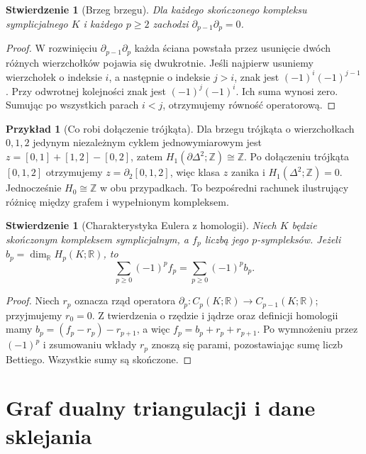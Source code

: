 \documentclass[11pt,a4paper]{report}
\numberwithin{equation}{section}
\theoremstyle{plain}
\newtheorem{stwierdzenie}[twierdzenie]{Stwierdzenie}
\theoremstyle{definition}
\newtheorem{przyklad}[twierdzenie]{Przykład}
\theoremstyle{remark}
\begin{document}
\begin{stwierdzenie}[Brzeg brzegu]
Dla każdego skończonego kompleksu symplicjalnego $K$
i każdego $p\ge2$ zachodzi $\partial_{p-1}\partial_p=0$.
\end{stwierdzenie}

\begin{proof}
W rozwinięciu $\partial_{p-1}\partial_p$ każda ściana
powstała przez usunięcie dwóch różnych wierzchołków
pojawia się dwukrotnie. Jeśli najpierw usuniemy wierzchołek
o indeksie $i$, a następnie o indeksie $j>i$, znak jest
$(-1)^i(-1)^{j-1}$. Przy odwrotnej kolejności znak jest
$(-1)^j(-1)^i$. Ich suma wynosi zero. Sumując po wszystkich
parach $i<j$, otrzymujemy równość operatorową.
\end{proof}

\begin{przyklad}[Co robi dołączenie trójkąta]
Dla brzegu trójkąta o wierzchołkach $0,1,2$ jedynym
niezależnym cyklem jednowymiarowym jest
$z=[0,1]+[1,2]-[0,2]$, zatem
$H_1(\partial\Delta^2;\mathbb Z)\cong\mathbb Z$.
Po dołączeniu trójkąta $[0,1,2]$ otrzymujemy
$z=\partial_2[0,1,2]$, więc klasa $z$ zanika i
$H_1(\Delta^2;\mathbb Z)=0$. Jednocześnie $H_0\cong\mathbb Z$
w obu przypadkach. To bezpośredni rachunek ilustrujący
różnicę między grafem i wypełnionym kompleksem.
\end{przyklad}

\begin{stwierdzenie}[Charakterystyka Eulera z homologii]
Niech $K$ będzie skończonym kompleksem symplicjalnym,
a $f_p$ liczbą jego $p$-sympleksów. Jeżeli
$b_p=\dim_{\mathbb R}H_p(K;\mathbb R)$, to
\[
\sum_{p\ge0}(-1)^pf_p=\sum_{p\ge0}(-1)^pb_p.
\]
\end{stwierdzenie}

\begin{proof}
Niech $r_p$ oznacza rząd operatora
$\partial_p:C_p(K;\mathbb R)\to C_{p-1}(K;\mathbb R)$;
przyjmujemy $r_0=0$. Z twierdzenia o rzędzie i jądrze
oraz definicji homologii mamy
$b_p=(f_p-r_p)-r_{p+1}$, a więc
$f_p=b_p+r_p+r_{p+1}$. Po wymnożeniu przez $(-1)^p$
i zsumowaniu wkłady $r_p$ znoszą się parami, pozostawiając
sumę liczb Bettiego. Wszystkie sumy są skończone.
\end{proof}

\section{Graf dualny triangulacji i dane sklejania}
\label{sec:tg-dual-triangulation}
\end{document}
